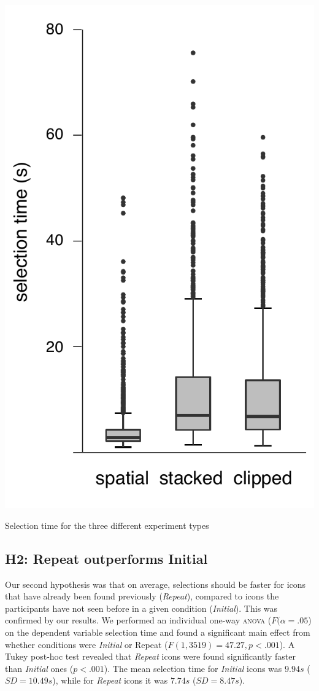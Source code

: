 \documentclass[nobib]{tufte-book} %
\begin{document}
\begin{marginfigure}
  \includegraphics[width=\linewidth]{duration-types.pdf}
  \caption{Selection time for the three different experiment types}
  \label{fig:duration-types}
\end{marginfigure}

\subsection{H2: Repeat outperforms Initial}
Our second hypothesis was that on average, selections should be faster for icons that have already been found previously (\emph{Repeat}), compared to icons the participants have not seen before in a given condition (\emph{Initial}). This was confirmed by our results. We performed an individual one-way \textsc{anova} ($F(\alpha = .05$) on the dependent variable selection time and found a significant main effect from whether conditions were \emph{Initial} or Repeat ($F(1,3519) = 47.27, p < .001$).
A Tukey post-hoc test revealed that \emph{Repeat} icons were found significantly faster than \emph{Initial} ones ($p < .001$). The mean selection time for \emph{Initial} icons was $9.94 s$ ($SD = 10.49 s$), while for \emph{Repeat} icons it was $7.74 s$ ($SD = 8.47 s$).
\end{document}
